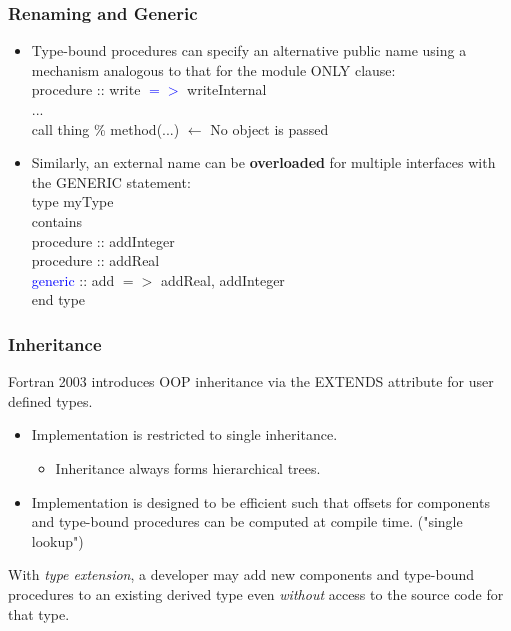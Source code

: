 \documentclass[11pt]{beamer}
\begin{document}
\begin{frame}[fragile]
\frametitle{Renaming and Generic}

\begin{itemize}
\item Type-bound procedures can specify an alternative public name using a mechanism analogous to that for the module ONLY clause:\\
  \quad procedure :: write \textcolor{blue}{$=>$} writeInternal\\
  \quad ...\\
  \quad call thing \% method(...)  $\leftarrow$ No object is passed \\
  
  \item Similarly, an external name can be \textbf{overloaded} for multiple interfaces with the GENERIC statement:\\
  \quad type myType\\
  \quad contains\\
  \quad \quad procedure :: addInteger\\
  \quad \quad procedure :: addReal\\
  \quad \quad \textcolor{blue}{generic} :: add $=> $ addReal, addInteger\\
  \quad end type\\
\end{itemize}

\end{frame}



\begin{frame}[fragile]
\frametitle{Inheritance}
Fortran 2003 introduces OOP inheritance via the EXTENDS attribute for user defined types.
\begin{itemize}
\item Implementation is restricted to single inheritance.
  \begin{itemize}
  \item Inheritance always forms hierarchical trees.
  \end{itemize}

\item Implementation is designed to be efficient such that offsets for components and type-bound procedures can be computed at compile time. ("single lookup")

\end{itemize}
With \emph{type extension}, a developer may add new components and type-bound procedures to an existing derived type even \emph{without} access to the source code for that type.
\end{frame}
\end{document}

